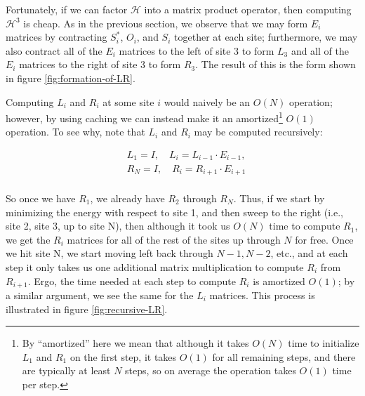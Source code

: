 \documentclass{amsbook}
\theoremstyle{plain}
\theoremstyle{definition}
\theoremstyle{remark}
\begin{document}
Fortunately, if we can factor $\mathscr{H}$ into a matrix product operator, then computing $\mathscr{H}^3$ is cheap.  As in the previous section, we observe that we may form $E_i$ matrices by contracting $S_i^*$, $O_i$, and $S_i$ together at each site;  furthermore, we may also contract all of the $E_i$ matrices to the left of site 3 to form $L_3$ and all of the $E_i$ matrices to the right of site 3 to form $R_3$.  The result of this is the form shown in figure \ref{fig:formation-of-LR}.

Computing $L_i$ and $R_i$ at some site $i$ would naively be an $O(N)$ operation; however, by using caching we can instead make it an amortized\footnote{By ``amortized'' here we mean that although it takes $O(N)$ time to initialize $L_1$ and $R_1$ on the first step, it takes $O(1)$ for all remaining steps, and there are typically at least $N$ steps, so on average the operation takes $O(1)$ time per step.} $O(1)$ operation.  To see why, note that $L_i$ and $R_i$ may be computed recursively:

$$
\begin{aligned}
&L_1 = I,\quad L_{i} = L_{i-1}\cdot E_{i-1},\\
&R_N = I,\quad R_i = R_{i+1}\cdot E_{i+1} \\
\end{aligned}
$$

So once we have $R_1$, we already have $R_2$ through $R_N$.  Thus, if we start by minimizing the energy with respect to site 1, and then sweep to the right (i.e., site 2, site 3, up to site N), then although it took us $O(N)$ time to compute $R_1$, we get the $R_i$ matrices for all of the rest of the sites up through $N$ for free.  Once we hit site N, we start moving left back through $N-1,N-2$, etc., and at each step it only takes us one additional matrix multiplication to compute $R_i$ from $R_{i+1}$.  Ergo, the time needed at each step to compute $R_i$ is amortized $O(1)$;  by a similar argument, we see the same for the $L_i$ matrices.  This process is illustrated in figure \ref{fig:recursive-LR}.
\end{document}
